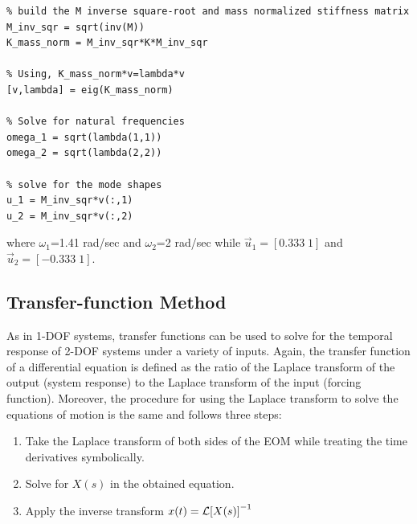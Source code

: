 \documentclass[12pt,letter]{article}
\begin{document}
\begin{example}
\begin{lstlisting}
% build the M inverse square-root and mass normalized stiffness matrix 
M_inv_sqr = sqrt(inv(M))
K_mass_norm = M_inv_sqr*K*M_inv_sqr

% Using, K_mass_norm*v=lambda*v
[v,lambda] = eig(K_mass_norm)

% Solve for natural frequencies
omega_1 = sqrt(lambda(1,1))
omega_2 = sqrt(lambda(2,2))

% solve for the mode shapes
u_1 = M_inv_sqr*v(:,1)
u_2 = M_inv_sqr*v(:,2)
				\end{lstlisting}
		\noindent where $\omega_1$=1.41 rad/sec and  $\omega_2$=2 rad/sec while $\vec{u}_1 = [0.333 \; 1]$ and $\vec{u}_2 = [-0.333 \; 1]$.
		\end{example}
	
	
	
	
	
	
	
	\subsection{Transfer-function Method}
	
	As in 1-DOF systems, transfer functions can be used to solve for the temporal response of 2-DOF systems under a variety of inputs. Again, the transfer function of a differential equation is defined as the ratio of the Laplace transform of the output (system response) to the Laplace transform of the input (forcing function). Moreover, the procedure for using the Laplace transform to solve the equations of motion is the same and follows three steps:
	\begin{enumerate}
		\item Take the Laplace transform of both sides of the EOM while treating the time derivatives symbolically.
		\item Solve for $X(s)$ in the obtained equation.
		\item Apply the inverse transform $x(t) = \mathcal{L}{\left[X(s)\right]}^{-1}$
	\end{enumerate}
	
\end{document}
